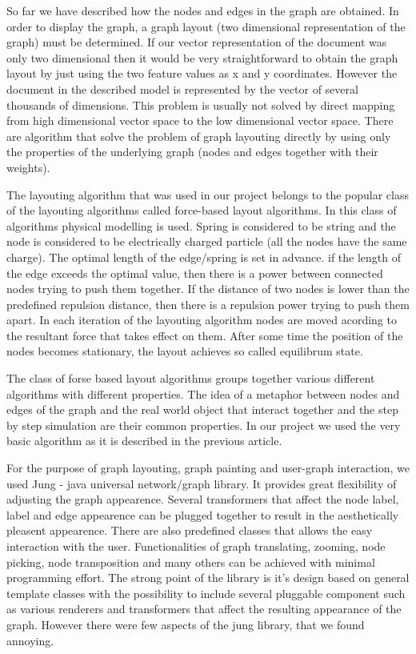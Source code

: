 
So far we have described how the nodes and edges in the graph are obtained. In order to display the graph, a graph layout (two dimensional representation of the graph) must be determined. If our vector representation of the document was only two dimensional then it would be very straightforward to obtain the graph layout
by just using the two feature values as x and y coordinates. However the document in the described model is represented by the vector of several thousands of dimensions. This problem is usually not solved by direct mapping from high dimensional vector space to the low dimensional vector space. There are algorithm that solve the problem of graph layouting directly by using only the properties of the underlying graph (nodes and edges together with their weights).

The layouting algorithm that was used in our project belongs to the popular class of the layouting algorithms called force-based layout algorithms. In this class of algorithms physical modelling is used. Spring is considered to be string and the node is considered to be electrically charged particle (all the nodes have the same charge). The optimal length of the edge/spring is set in advance. if the length of the edge exceeds the optimal value, then there is a power between connected nodes trying to push them together. If the distance of two nodes is lower than the predefined repulsion distance, then there is a repulsion power trying to push them apart. In each iteration of the layouting algorithm nodes are moved acording to the resultant force that takes effect on them. After some time the position of the nodes becomes stationary, the layout achieves so called equilibrum state.

The class of forse based layout algorithms groups together various different algorithms with different properties. The idea of a metaphor between nodes and edges of the graph and the real world object that interact together and the step by step simulation are their common properties. In our project we used the very basic algorithm as it is described in the previous article.

For the purpose of graph layouting, graph painting and user-graph interaction, we used Jung - java universal network/graph library. It provides great flexibility of adjusting the graph appearence. Several transformers that affect the node label, label and edge appearence can be plugged together to result in the aesthetically pleasent appearence. There are also predefined classes that allows the easy interaction with the user. Functionalities of graph translating, zooming, node picking, node transposition and many others can be achieved with minimal programming effort. The strong point of the library is it's design based on general template classes with the possibility to include several pluggable component such as various renderers and transformers that affect the resulting appearance of the graph. However there were few aspects of the jung library, that we found annoying.

